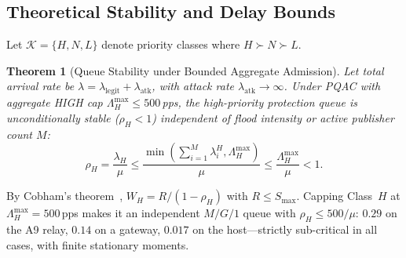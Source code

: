 \documentclass[journal]{IEEEtran}
\newtheorem{theorem}{Theorem}
\newenvironment{proof}{\begin{IEEEproof}}{\end{IEEEproof}}
\begin{document}
\subsection{Theoretical Stability and Delay Bounds}
Let $\mathcal{K} = \{H, N, L\}$ denote priority classes where $H \succ N \succ L$.

\begin{theorem}[Queue Stability under Bounded Aggregate Admission]
\label{thm:stability}
Let total arrival rate be $\lambda = \lambda_{\text{legit}} + \lambda_{\text{atk}}$, with attack rate $\lambda_{\text{atk}} \to \infty$. Under PQAC with aggregate HIGH cap $\Lambda_H^{\max} \le 500$\,pps, the high-priority protection queue is unconditionally stable ($\rho_H < 1$) independent of flood intensity or active publisher count $M$:
\begin{equation}
\rho_H = \frac{\lambda_H}{\mu} \le \frac{\min\left(\sum_{i=1}^M \lambda_i^H, \Lambda_H^{\max}\right)}{\mu} \le \frac{\Lambda_H^{\max}}{\mu} < 1.
\end{equation}
\end{theorem}
\begin{proof}
By Cobham's theorem~\cite{cobham1954priority}, $W_H=R/(1-\rho_H)$ with $R\le S_{\max}$. Capping Class~$H$ at $\Lambda_H^{\max}=500$\,pps makes it an independent $M/G/1$ queue with $\rho_H\le 500/\mu$: $0.29$ on the A9 relay, $0.14$ on a gateway, $0.017$ on the host---strictly sub-critical in all cases, with finite stationary moments.
\end{proof}
\end{document}
